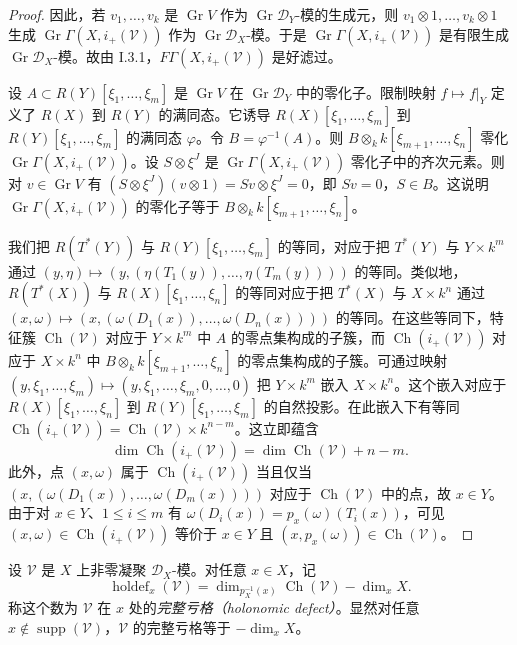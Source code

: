 \begin{proof}
因此，若 $v_1,\dots,v_k$ 是 $\operatorname{Gr}V$ 作为 $\operatorname{Gr}\mathcal{D}_Y$-模的生成元，则 $v_1\otimes1,\dots,v_k\otimes1$ 生成 $\operatorname{Gr}\Gamma(X,i_+(\mathcal{V}))$ 作为 $\operatorname{Gr}\mathcal{D}_X$-模。于是 $\operatorname{Gr}\Gamma(X,i_+(\mathcal{V}))$ 是有限生成 $\operatorname{Gr}\mathcal{D}_X$-模。故由 I.3.1，$F\Gamma(X,i_+(\mathcal{V}))$ 是好滤过。

设 $A\subset R(Y)[\xi_1,\dots,\xi_m]$ 是 $\operatorname{Gr}V$ 在 $\operatorname{Gr}\mathcal{D}_Y$ 中的零化子。限制映射 $f\mapsto f|_Y$ 定义了 $R(X)$ 到 $R(Y)$ 的满同态。它诱导 $R(X)[\xi_1,\dots,\xi_m]$ 到 $R(Y)[\xi_1,\dots,\xi_m]$ 的满同态 $\varphi$。令 $B=\varphi^{-1}(A)$。则 $B\otimes_kk[\xi_{m+1},\dots,\xi_n]$ 零化 $\operatorname{Gr}\Gamma(X,i_+(\mathcal{V}))$。设 $S\otimes\xi^J$ 是 $\operatorname{Gr}\Gamma(X,i_+(\mathcal{V}))$ 零化子中的齐次元素。则对 $v\in\operatorname{Gr}V$ 有
$(S\otimes\xi^J)(v\otimes1)=Sv\otimes\xi^J=0$，即 $Sv=0$，$S\in B$。这说明 $\operatorname{Gr}\Gamma(X,i_+(\mathcal{V}))$ 的零化子等于 $B\otimes_kk[\xi_{m+1},\dots,\xi_n]$。

我们把 $R(T^*(Y))$ 与 $R(Y)[\xi_1,\dots,\xi_m]$ 的等同，对应于把 $T^*(Y)$ 与 $Y\times k^m$ 通过
$(y,\eta)\mapsto(y,(\eta(T_1(y)),\dots,\eta(T_m(y))))$ 的等同。类似地，$R(T^*(X))$ 与 $R(X)[\xi_1,\dots,\xi_n]$ 的等同对应于把 $T^*(X)$ 与 $X\times k^n$ 通过 $(x,\omega)\mapsto(x,(\omega(D_1(x)),\dots,\omega(D_n(x))))$ 的等同。在这些等同下，特征簇 $\operatorname{Ch}(\mathcal{V})$ 对应于 $Y\times k^m$ 中 $A$ 的零点集构成的子簇，而 $\operatorname{Ch}(i_+(\mathcal{V}))$ 对应于 $X\times k^n$ 中
$B\otimes_kk[\xi_{m+1},\dots,\xi_n]$ 的零点集构成的子簇。可通过映射
$(y,\xi_1,\dots,\xi_m)\mapsto(y,\xi_1,\dots,\xi_m,0,\dots,0)$ 把 $Y\times k^m$ 嵌入 $X\times k^n$。这个嵌入对应于 $R(X)[\xi_1,\dots,\xi_n]$ 到 $R(Y)[\xi_1,\dots,\xi_m]$ 的自然投影。在此嵌入下有等同 $\operatorname{Ch}(i_+(\mathcal{V}))=\operatorname{Ch}(\mathcal{V})\times k^{n-m}$。这立即蕴含
$$\dim\operatorname{Ch}(i_+(\mathcal{V}))=\dim\operatorname{Ch}(\mathcal{V})+n-m.$$
此外，点 $(x,\omega)$ 属于 $\operatorname{Ch}(i_+(\mathcal{V}))$ 当且仅当
$(x,(\omega(D_1(x)),\dots,\omega(D_m(x))))$ 对应于 $\operatorname{Ch}(\mathcal{V})$ 中的点，故 $x\in Y$。由于对 $x\in Y$、$1\le i\le m$ 有 $\omega(D_i(x))=p_x(\omega)(T_i(x))$，可见 $(x,\omega)\in\operatorname{Ch}(i_+(\mathcal{V}))$ 等价于 $x\in Y$ 且 $(x,p_x(\omega))\in\operatorname{Ch}(\mathcal{V})$。
\end{proof}

设 $\mathcal{V}$ 是 $X$ 上非零凝聚 $\mathcal{D}_X$-模。对任意 $x\in X$，记
$$\operatorname{holdef}_x(\mathcal{V})=\dim_{p_X^{-1}(x)}\operatorname{Ch}(\mathcal{V})-\dim_xX.$$
称这个数为 $\mathcal{V}$ 在 $x$ 处的\emph{完整亏格（holonomic defect）}。显然对任意 $x\notin\operatorname{supp}(\mathcal{V})$，$\mathcal{V}$ 的完整亏格等于 $-\dim_xX$。

